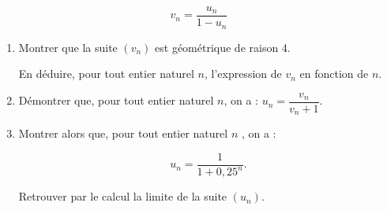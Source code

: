 \begin{enumerate}
\[v_n  = \dfrac{u_n}{1 - u_n}\]

	\begin{enumerate}
		\item Montrer que la suite $\left(v_n\right)$ est géométrique de raison 4.
		
En déduire, pour tout entier naturel $n$, l'expression de $v_n$ en fonction de $n$.
		\item Démontrer que, pour tout entier naturel $n$, on a : $u_n = \dfrac{v_n}{v_n + 1}$. 
		\item Montrer alors que, pour tout entier naturel $n$ , on a :
		
		\[u_n = \dfrac{1}{1 + 0,25^n}.\]

Retrouver par le calcul la limite de la suite $\left(u_n\right)$.
	\end{enumerate}
\end{enumerate}

\bigskip

